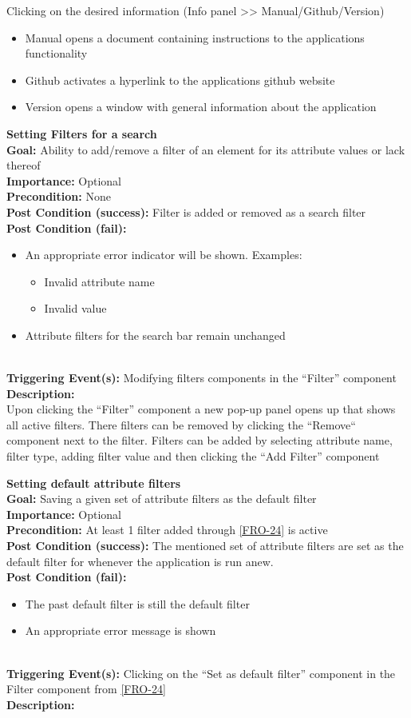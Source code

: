 \documentclass[10pt,a4paper]{report}
\newcommand{\precondition}[1]{
    \textbf{Precondition: } #1 \leavevmode \\
}
\newcommand{\FRODescription}[8]{
    \textbf{#1} \leavevmode \\
    \textbf{Goal: } #2 \leavevmode \\
    \textbf{Importance: } #3 \leavevmode \\
    \precondition{#4}
    \textbf{Post Condition (success): } #5 \leavevmode \\
    \textbf{Post Condition (fail): } #6 \leavevmode \\
    \textbf{Triggering Event(s): } #7 \leavevmode \\
    \textbf{Description: } \leavevmode \\
    #8}
\begin{document}
\begin{FRO}
    {Clicking on the desired information (Info panel >> Manual/Github/Version)}
    {\begin{itemize}
        \item Manual opens a document containing instructions to the applications functionality
        \item Github activates a hyperlink to the applications github website
        \item Version opens a window with general information about the application
    \end{itemize}}
    \item \FRODescription{Setting Filters for a search}
    {Ability to add/remove a filter of an element for its attribute values or lack thereof}
    {Optional}
    {None}
    {Filter is added or removed as a search filter}
    {\begin{itemize}
        \item An appropriate error indicator will be shown. Examples:
        \begin{itemize}
            \item Invalid attribute name
            \item Invalid value
        \end{itemize}
        \item Attribute filters for the search bar remain unchanged
    \end{itemize}}
    {Modifying filters components in the “Filter” component}
    {Upon clicking the “Filter” component a new pop-up panel opens up that shows all active filters. There filters can be removed by clicking the “Remove“ component next to the filter. Filters can be added by selecting attribute name, filter type, adding filter value and then clicking the “Add Filter” component}
    \item \FRODescription{Setting default attribute filters}
    {Saving a given set of attribute filters as the default filter}
    {Optional}
    {At least 1 filter added through \ref{FRO-24} is active}
    {The mentioned set of attribute filters are set as the default filter for whenever the application is run anew.}
    {\begin{itemize}
        \item The past default filter is still the default filter
        \item An appropriate error message is shown
    \end{itemize}}
    {Clicking on the “Set as default filter” component in the Filter component from \ref{FRO-24}}
\end{FRO}
\end{document}
